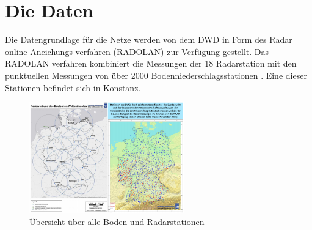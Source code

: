 \section{Die Daten}\label{die daten}
\begin{sloppypar}
    Die Datengrundlage für die Netze werden von dem DWD in Form des Radar online Aneichungs verfahren (RADOLAN) zur Verfügung gestellt. 
    Das RADOLAN verfahren kombiniert die Messungen der 18 Radarstation mit den punktuellen Messungen von über 2000 Bodenniederschlagsstationen \cite{dwdLeistungen}. 
    Eine dieser Stationen befindet sich in Konstanz.
\end{sloppypar}

\begin{figure}[htb]
 \centering
 \includegraphics[width=0.6\textwidth,angle=0]{abb/daten_stationsuebersicht}
 \caption[Stationen Übersicht]{Übersicht über alle Boden und Radarstationen \cite{DWDKurzbeschreibung}}
\label{fig:daten_stationsuebersicht}
\end{figure}

